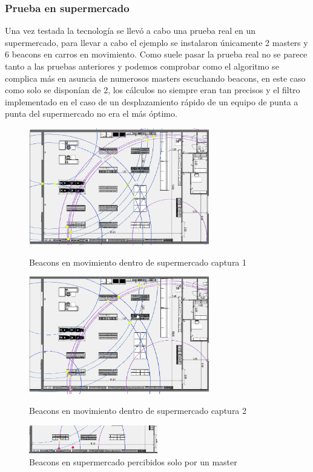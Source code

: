 \documentclass[paper=a4, fontsize=11pt,twoside]{scrartcl}
\begin{document}
        \subsubsection{Prueba en supermercado}
            Una vez testada la tecnología se llevó a cabo una prueba real en un supermercado, para llevar a cabo el ejemplo
            se instalaron únicamente 2 masters y 6 beacons en carros en movimiento.
            Como suele pasar la prueba real no se parece tanto a las pruebas anteriores y podemos comprobar como 
            el algoritmo se complica más en asuncia de numerosos masters escuchando beacons, en este caso como solo se disponían
            de 2, los cálculos no siempre eran tan precisos y el filtro implementado en el caso de un desplazamiento rápido de un 
            equipo de punta a punta del supermercado no era el más óptimo.
            \begin{center}
                \begin{figure}[]
                    \centering
                    \includegraphics[width=0.7\textwidth]{../../Memmory/images/agrupation_3.PNG}
                    \caption{Beacons en movimiento dentro de supermercado captura 1}
                    \includegraphics[width=0.7\textwidth]{../../Memmory/images/agrupation_2.PNG}
                    \caption{Beacons en movimiento dentro de supermercado captura 2}
                    \includegraphics[width=0.5\textwidth]{../../Memmory/images/agrupation_1.PNG}
                    \caption{Beacons en supermercado percibidos solo por un master}
                    \label{fig:mesh10}
                \end{figure}
            \end{center}   
            
\end{document}
